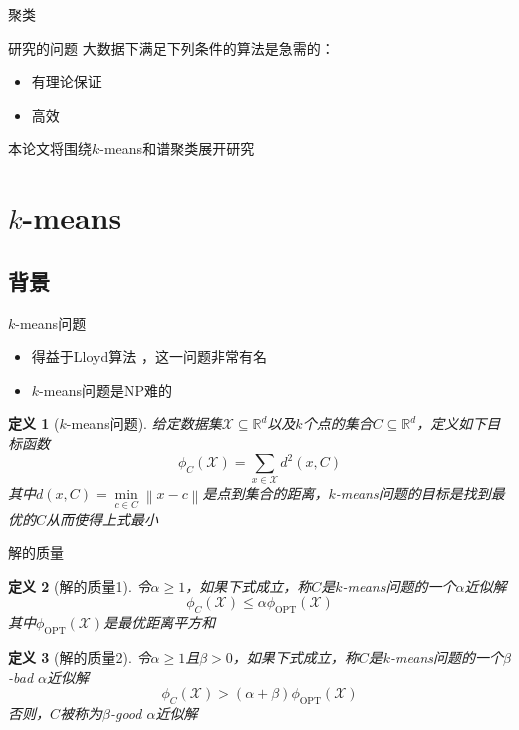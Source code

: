 \documentclass[notheorems]{beamer}
\newcommand{\R}{\mathbb{R}}
\newcommand{\norm}[1]{\left\lVert#1\right\rVert}
\newtheorem{definition}{定义}
\begin{document}
\begin{CJK*}{UTF8}{gbsn}
\begin{frame}{聚类}
\end{frame}

\begin{frame}{研究的问题}
大数据下满足下列条件的算法是急需的：
\begin{itemize}
	\item 有理论保证
	\item 高效
\end{itemize}
本论文将围绕$k$-means和谱聚类展开研究
\end{frame}

\section{$k$-means}

\subsection{背景}

\begin{frame}{$k$-means问题}

\begin{itemize}
	\item 得益于Lloyd算法 \citep{lloyd1982least}，这一问题非常有名
	\item $k$-means问题是NP难的
\end{itemize}
\begin{definition}[$k$-means问题]
	给定数据集$\mathcal{X} \subseteq \R^d$以及$k$个点的集合$C \subseteq \R^d$，定义如下目标函数
	\begin{equation}
		\phi_C(\mathcal{X}) = \sum_{x \in \mathcal{X}}d^2 (x,C)
	\end{equation}
	其中$d(x,C) = \min\limits_{c \in C}\norm{x - c}$是点到集合的距离，$k$-means问题的目标是找到最优的$C$从而使得上式最小
\end{definition}

\end{frame}

\begin{frame}{解的质量}
	\begin{definition}[解的质量1]
		令$\alpha \geq 1$，如果下式成立，称$C$是$k$-means问题的一个$\alpha$近似解
		\begin{equation}
		\phi_C(\mathcal{X}) \leq \alpha \phi_\text{OPT}(\mathcal{X})
		\end{equation}
		其中$\phi_\text{OPT}(\mathcal{X})$是最优距离平方和
	\end{definition}
	\begin{definition}[解的质量2]
		令$\alpha \geq 1$且$\beta > 0$，如果下式成立，称$C$是$k$-means问题的一个$\beta$-bad $\alpha$近似解
		\begin{equation}
		\phi_C(\mathcal{X}) > (\alpha + \beta)\phi_\text{OPT}(\mathcal{X})
		\end{equation}
		否则，$C$被称为$\beta$-good $\alpha$近似解
	\end{definition}
\end{frame}


\end{CJK*}
\end{document}
